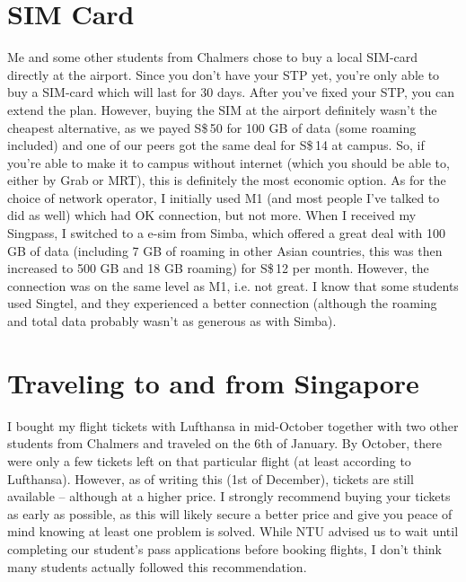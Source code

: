 \section*{SIM Card}
\label{sims}
Me and some other students from Chalmers chose to buy a local SIM-card directly at the airport. Since you don't have your STP yet, you're only able to buy a SIM-card which will last for 30 days. After you've fixed your STP, you can extend the plan. However, buying the SIM at the airport definitely wasn't the cheapest alternative, as we payed S\$\,50 for 100 GB of data (some roaming included) and one of our peers got the same deal for S\$$\,$14 at campus. So, if you're able to make it to campus without internet (which you should be able to, either by Grab or MRT), this is definitely the most economic option. As for the choice of network operator, I initially used M1 (and most people I've talked to did as well) which had OK connection, but not more. When I received my Singpass, I switched to a e-sim from Simba, which offered a great deal with 100 GB of data (including 7 GB of roaming in other Asian countries, this was then increased to 500 GB and 18 GB roaming) for S\$\,12 per month. However, the connection was on the same level as M1, i.e. not great. I know that some students used Singtel, and they experienced a better connection (although the roaming and total data probably wasn't as generous as with Simba).
\section*{Traveling to and from Singapore}
{}
I bought my flight tickets with Lufthansa in mid-October together with two other students from Chalmers and traveled on the 6th of January. By October, there were only a few tickets left on that particular flight (at least according to Lufthansa). However, as of writing this (1st of December), tickets are still available -- although at a higher price. I strongly recommend buying your tickets as early as possible, as this will likely secure a better price and give you peace of mind knowing at least one problem is solved. While NTU advised us to wait until completing our student's pass applications before booking flights, I don't think many students actually followed this recommendation.

